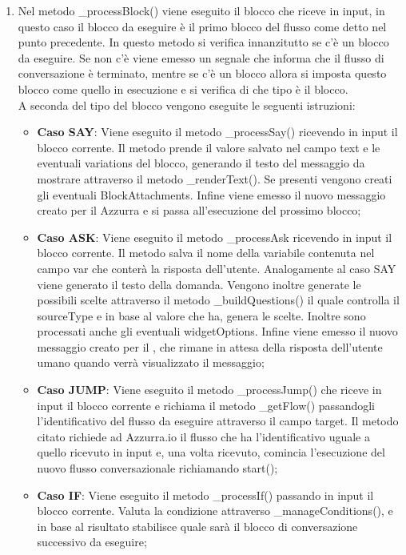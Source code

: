 \begin{enumerate}
	\item Nel metodo \_processBlock() viene eseguito il blocco che riceve in input, in questo caso il blocco da eseguire è il primo blocco del flusso come detto nel punto precedente. In questo metodo si verifica innanzitutto se c'è un blocco da eseguire. Se non c'è viene emesso un segnale che informa che il flusso di conversazione è terminato, mentre se c'è un blocco allora si imposta questo blocco come quello in esecuzione e si verifica di che tipo è il blocco.\\
	A seconda del tipo del blocco vengono eseguite le seguenti istruzioni:
	\begin{itemize}
		\item \textbf{Caso SAY}: Viene eseguito il metodo \_processSay() ricevendo in input il blocco corrente. Il metodo prende il valore salvato nel campo text e le eventuali variations del blocco, generando il testo del messaggio da mostrare attraverso il metodo \_renderText(). Se presenti vengono creati gli eventuali BlockAttachments. Infine viene emesso il nuovo messaggio creato per il  Azzurra e si passa all'esecuzione del prossimo blocco;
		\item \textbf{Caso ASK}: Viene eseguito il metodo \_processAsk ricevendo in input il blocco corrente. Il metodo salva il nome della variabile contenuta nel campo var che conterà la risposta dell'utente. Analogamente al caso SAY viene generato il testo della domanda. Vengono inoltre generate le possibili scelte attraverso il metodo \_buildQuestions() il quale controlla il sourceType e in base al valore che ha, genera le scelte. Inoltre sono processati anche gli eventuali widgetOptions. Infine viene emesso il nuovo messaggio creato per il , che rimane in attesa della risposta dell'utente umano quando verrà visualizzato il messaggio;
		\item \textbf{Caso JUMP}: Viene eseguito il metodo \_processJump() che riceve in input il blocco corrente e richiama il metodo \_getFlow() passandogli l'identificativo del flusso da eseguire attraverso il campo target. Il metodo citato richiede ad Azzurra.io il flusso che ha l'identificativo uguale a quello ricevuto in input e, una volta ricevuto, comincia l'esecuzione del nuovo flusso conversazionale richiamando start();
		\item \textbf{Caso IF}: Viene eseguito il metodo \_processIf() passando in input il blocco corrente. Valuta la condizione attraverso \_manageConditions(), e in base al risultato stabilisce quale sarà il blocco di conversazione successivo da eseguire;

\end{itemize}
\end{enumerate}
